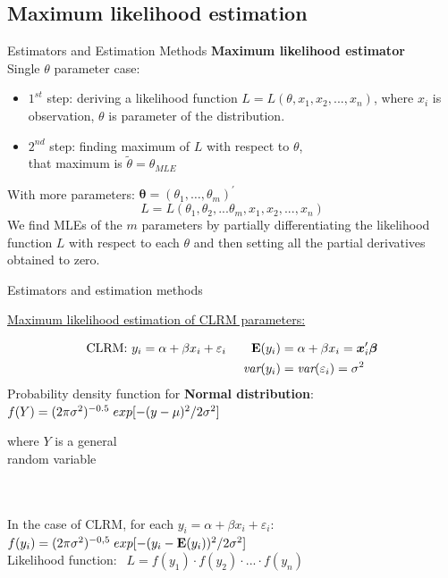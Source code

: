 \documentclass{beamer}
\begin{document}
\subsection{Maximum likelihood estimation}
\begin{frame}{Estimators and Estimation Methods}
\textbf{Maximum likelihood estimator}\\
\medskip
Single $\theta$ parameter case:\\
\begin{itemize}
\item $1^{st}$ step: deriving a likelihood function $L=L(\theta ,x_1, x_2, ... , x_n)$, where $x_i$ is observation, $\theta$ is parameter of the distribution.\\
\item $2^{nd}$ step: finding maximum of $L$ with respect to $\theta$, \\that maximum is $\tilde{\theta} = \theta_{MLE}$
\end{itemize}
With more parameters: $\bm{\theta} = (\theta_1, \dots , \theta_m)^{\prime}$
$$L=L(\theta_1, \theta_2, ... \theta_m, x_1, x_2, ... , x_n)$$
We find MLEs of the $m$ parameters by partially differentiating the likelihood function $L$ with respect to each $\theta$ and then setting all the partial derivatives obtained to zero.\\
\end{frame}
\begin{frame}{Estimators and estimation methods}
\centerline{\underline{Maximum likelihood estimation of CLRM parameters:}}
\begin{align*}
\textnormal{CLRM: } y_i= \alpha + \beta x_i + \varepsilon_i \qquad \mathbf{E}(y_i) & =\alpha +\beta x_i = \bm{x}_i^{\prime}\bm{\beta}\\
\textit{var}(y_i) & =\textit{var}(\varepsilon_i)=\sigma^2
\end{align*}
Probability density function for \textbf{Normal distribution}:
$f(Y)=(2\pi\sigma^2)^{-0.5} \hspace{0.1cm} exp[-(y-\mu)^2/2\sigma^2]$ \parbox[t]{10em}{where $Y$ is a general \\ random variable} \\
~~\\
\bigskip
In the case of CLRM, for each $y_i=\alpha + \beta x_i + \varepsilon_i$: \\
\bigskip
$f(y_i)=(2\pi\sigma^2)^{-0,5} \hspace{0.1cm} exp[-(y_i-\mathbf{E}(y_i))^2/2\sigma^2]$\\
Likelihood function: $~~L =f(y_1) \cdot f(y_2) \cdot ... \cdot f(y_n)$
\end{frame}
\end{document}
